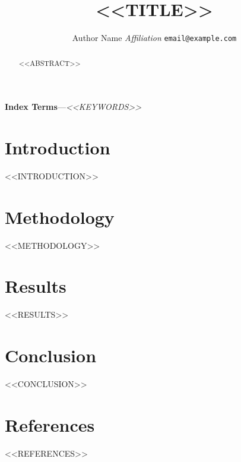 \documentclass[10pt,twocolumn]{article}
\title{<<TITLE>>}
\author{Author Name \quad \textit{Affiliation} \quad \texttt{email@example.com}}
\date{}
\makeatletter
\renewcommand{\maketitle}{%
  \twocolumn[%
    \begin{@twocolumnfalse}
      \centering
      {\LARGE \bfseries \@title \par}\vspace{0.5em}
      {\normalsize \@author \par}\vspace{0.3em}
      {\small \@date \par}\vspace{1.2em}
    \end{@twocolumnfalse}
  ]%
}
\makeatother
\begin{document}
\maketitle

\begin{abstract}
\boldmath
<<ABSTRACT>>
\end{abstract}

\noindent\textbf{Index Terms}---\textit{<<KEYWORDS>>}

\section{Introduction}
<<INTRODUCTION>>

\section{Methodology}
<<METHODOLOGY>>

\section{Results}
<<RESULTS>>

\section{Conclusion}
<<CONCLUSION>>

\section*{References}
\small
<<REFERENCES>>
\end{document}
